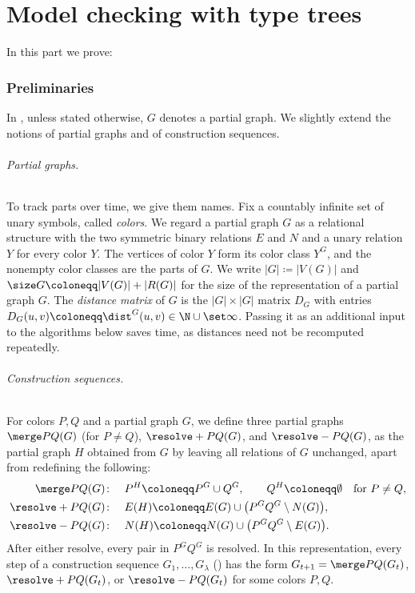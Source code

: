  \part{Model checking with type trees}
 \label{part:mc}

 In this part we prove:
{\renewcommand{\mcdepth}{d}\mcthm*}

\section{Preliminaries}\label{sec:mc-prelims}

In ,
unless stated otherwise, $G$ denotes a partial graph.
We slightly extend the notions of partial graphs and of construction sequences.

\paragraph{Partial graphs.}
To track parts over time, we give them names.
Fix a countably infinite set of unary symbols, called \emph{colors}.
We regard a partial graph $G$ as a relational structure with the two symmetric binary relations $E$ and $N$ and a unary relation $Y$ for every color $Y$.
The vertices of color $Y$ form its color class $Y^G$, and the nonempty color classes are the parts of $G$.
We write $|G|\coloneqq|V(G)|$ and $\size G\coloneqq|V(G)|+|R(G)|$ for the size of the representation of a partial graph $G$.
The \emph{distance matrix} of $G$ is the $|G|\times|G|$ matrix $D_G$ with entries $D_G(u,v)\coloneqq\dist^G(u,v)\in\N\cup\set\infty$.
Passing it as an additional input to the algorithms below saves time, as distances need not be recomputed repeatedly.

\paragraph{Construction sequences.}
For colors $P,Q$ and a partial graph $G$, we define three partial graphs
$\merge PQ(G)$ (for $P\neq Q$), $\resolve+PQ(G)$, and $\resolve-PQ(G)$, as the partial graph $H$ obtained from $G$ by leaving all relations of $G$ unchanged, apart from redefining the following:
\begin{align*}
\merge PQ(G)\colon\quad&
P^{H}\coloneqq P^G\cup Q^G,
\qquad
Q^{H}\coloneqq\emptyset
&&\text{for $P\ne Q$},\\
\resolve+PQ(G)\colon\quad&
E(H)\coloneqq E(G)\cup\bigl(P^GQ^G\setminus N(G)\bigr),\\
\resolve-PQ(G)\colon\quad&
N(H)\coloneqq N(G)\cup\bigl(P^GQ^G\setminus E(G)\bigr).
\end{align*}
After either resolve, every pair in $P^GQ^G$ is resolved.
In this representation, every step of a construction sequence $G_1,\ldots,G_\lambda$ () has the form $G_{t+1}=\merge PQ(G_t)$, $\resolve+PQ(G_t)$, or $\resolve-PQ(G_t)$ for some colors $P,Q$.

